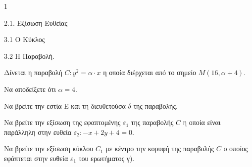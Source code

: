 \begin{ylh}{1}
    \item 2.1. Εξίσωση Ευθείας
    \item 3.1 Ο Κύκλος
    \item 3.2 Η Παραβολή.
\end{ylh}
Δίνεται η παραβολή $C: y^2 = \alpha \cdot x$ η οποία διέρχεται από το σημείο $M(16, \alpha+4)$.
\begin{alist}
\item Να αποδείξετε ότι $\alpha = 4$. 
\item Να βρείτε την εστία E και τη διευθετούσα $\delta$ της παραβολής. 
\item Να βρείτε την εξίσωση της εφαπτομένης $\varepsilon_1$ της παραβολής $C$ η οποία είναι παράλληλη στην ευθεία $\varepsilon_2: -x+2y+4=0$. 
\item Να βρείτε την εξίσωση κύκλου $C_1$ με κέντρο την κορυφή της παραβολής $C$ ο οποίος εφάπτεται στην ευθεία $\varepsilon_1$ του ερωτήματος γ). 
\end{alist}